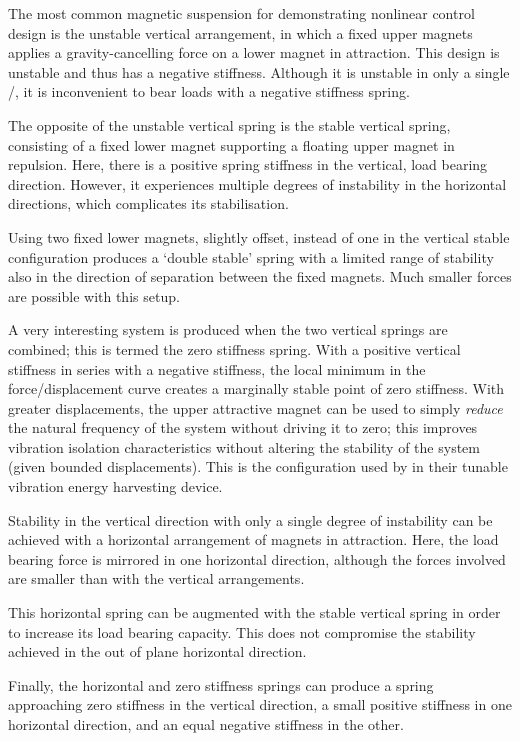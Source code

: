 \documentclass[11pt,a4paper]{memoir}
\begin{document}
The most common magnetic suspension for demonstrating nonlinear
control design is the unstable vertical arrangement, in which a fixed
upper magnets applies a gravity-cancelling force on a lower magnet in
attraction. This design is unstable and thus has a negative
stiffness. Although it is unstable in only a single \dof/,
it is inconvenient to bear loads with a negative stiffness spring.

The opposite of the unstable vertical spring is the stable vertical
spring, consisting of a fixed lower magnet supporting a floating upper
magnet in repulsion. Here, there is a positive spring stiffness in the
vertical, load bearing direction. However, it experiences multiple
degrees of instability in the horizontal directions, which complicates
its stabilisation.

Using two fixed lower magnets, slightly offset, instead of one in the
vertical stable configuration produces a `double stable' spring with a
limited range of stability also in the direction of separation between
the fixed magnets. Much smaller forces are possible with this setup.

A very interesting system is produced when the two vertical springs
are combined; this is termed the zero stiffness spring. With a
positive vertical stiffness in series with a negative stiffness, the
local minimum in the force/displacement curve creates a marginally
stable point of zero stiffness. With greater displacements, the upper
attractive magnet can be used to simply \emph{reduce} the natural
frequency of the system without driving it to zero; this improves
vibration isolation characteristics without altering the stability of
the system (given bounded displacements). This is the configuration
used by \textcite{challa2008} in their tunable vibration energy
harvesting device.

Stability in the vertical direction with only a single degree of
instability can be achieved with a horizontal arrangement of magnets
in attraction. Here, the load bearing force is mirrored in one
horizontal direction, although the forces involved are smaller than
with the vertical arrangements.

This horizontal spring can be augmented with the stable vertical
spring in order to increase its load bearing capacity. This does not
compromise the stability achieved in the out of plane horizontal
direction.

Finally, the horizontal and zero stiffness springs can produce a
spring approaching zero stiffness in the vertical direction, a small positive
stiffness in one horizontal direction, and an equal negative stiffness
in the other.
\end{document}
